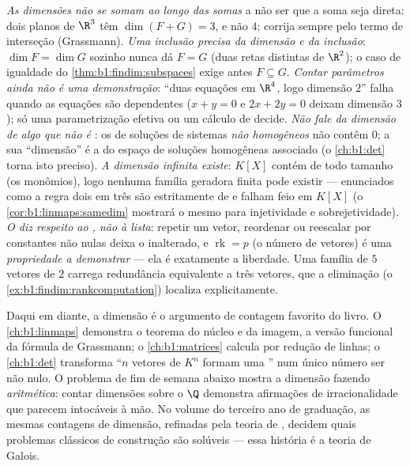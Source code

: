 \begin{remark}
\label{rem:b1:findim:pitfalls}
\emph{As dimensões não se somam ao longo das somas} a não ser que a
soma seja direta: dois planos de $\R^3$ têm $\dim(F + G) = 3$, e não $4$;
corrija sempre pelo termo de interseção (Grassmann).
\emph{Uma inclusão precisa da dimensão \emph{e} da inclusão}:
$\dim F = \dim G$ sozinho nunca dá $F = G$ (duas retas distintas de $\R^2$); o
caso de igualdade do \cref{thm:b1:findim:subspaces} exige antes $F \subseteq G$.
\emph{Contar parâmetros ainda não é uma demonstração}: ``duas
equações em $\R^4$, logo dimensão $2$'' falha quando as equações
são dependentes ($x + y = 0$ e $2x + 2y = 0$ deixam dimensão $3$); só uma
parametrização efetiva ou um cálculo de  decide.
\emph{Não fale da dimensão de algo que não é }: os
 de soluções de sistemas \emph{não homogêneos} não contêm
$0$; a sua ``dimensão'' é a do espaço de soluções homogêneas
associado (o \cref{ch:b1:det} torna isto preciso).
\emph{A dimensão infinita existe}: $K[X]$ contém  de
todo tamanho (os monômios), logo nenhuma família geradora finita
pode existir --- enunciados como a regra dois em três são
estritamente de  e falham feio em $K[X]$
(o \cref{cor:b1:linmaps:samedim} mostrará o mesmo para injetividade e sobrejetividade).
\emph{O  diz respeito ao , não à lista}: repetir
um vetor, reordenar ou reescalar por constantes não nulas deixa o
 inalterado, e $\operatorname{rk} = p$ (o número de vetores) é uma
\emph{propriedade a demonstrar} --- ela é exatamente a liberdade.
Uma família de $5$ vetores de  $2$ carrega redundância
equivalente a três vetores, que a eliminação
(o \cref{ex:b1:findim:rankcomputation}) localiza explicitamente.
\end{remark}

\begin{remark}
\label{rem:b1:findim:whereused}
Daqui em diante, a dimensão é o argumento de contagem favorito do
livro. O \cref{ch:b1:linmaps} demonstra o teorema do núcleo e da imagem, a versão
funcional da fórmula de Grassmann; o \cref{ch:b1:matrices} calcula  por
redução de linhas; o \cref{ch:b1:det} transforma ``$n$ vetores de $K^n$ formam
uma '' num único número ser não nulo. O problema de fim de
semana abaixo mostra a dimensão fazendo \emph{aritmética}: contar
dimensões sobre o  $\Q$ demonstra afirmações de
irracionalidade que parecem intocáveis à mão. No volume do terceiro
ano de graduação, as mesmas contagens de dimensão, refinadas pela
teoria de , decidem quais problemas clássicos de construção
são solúveis --- essa história é a teoria de Galois.
\end{remark}

